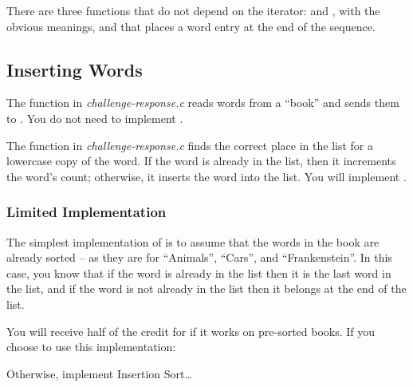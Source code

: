 There are three functions that do not depend on the iterator:
 and , with the obvious meanings,
and  that places a word entry at the end of the sequence.

\begin{description}
\end{description}


\subsection{Inserting Words}

The  function in \textit{challenge-response.c} reads words from a ``book'' and sends them to .
You do not need to implement .

The  function in \textit{challenge-response.c} finds the correct place in the list for a lowercase copy of the word.
If the word is already in the list, then it increments the word's count;
otherwise, it inserts the word into the list.
You will implement .

\subsubsection{Limited Implementation}

The simplest implementation of  is to assume that the words in the book are already sorted -- as they are for ``Animals'', ``Cars'', and ``Frankenstein''.
In this case, you know that if the word is already in the list then it is the last word in the list,
and if the word is not already in the list then it belongs at the end of the list.

You will receive half of the credit for  if it works on pre-sorted books.
If you choose to use this implementation:
\begin{description}
\end{description}

Otherwise, implement Insertion Sort\dots

